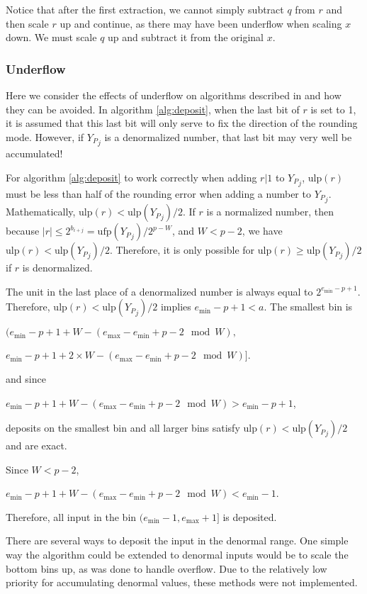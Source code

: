 \documentclass[12pt]{article}
\providecommand{\min}{\ensuremath{\text{min}}}
\providecommand{\max}{\ensuremath{\text{max}}}
\providecommand{\ulp}{\ensuremath{\text{ulp}}}
\providecommand{\ufp}{\ensuremath{\text{ufp}}}
\theoremstyle{plain}
\begin{document}
      Notice that after the first extraction, we cannot simply subtract $q$ from $r$ and then scale $r$ up and continue, as there may have been underflow when scaling $x$ down. We must scale $q$ up and subtract it from the original $x$.

    \subsubsection{Underflow}
      \label{sec:underflow}
      Here we consider the effects of underflow on algorithms described in \cite{repsum} and how they can be avoided. In algorithm \ref{alg:deposit}, when the last bit of $r$ is set to 1, it is assumed that this last bit will only serve to fix the direction of the rounding mode. However, if ${Y_P}_j$ is a denormalized number, that last bit may very well be accumulated!

      For algorithm \ref{alg:deposit} to work correctly when adding $r | 1$ to ${Y_P}_j$, $\ulp(r)$ must be less than half of the rounding error when adding a number to ${Y_P}_j$. Mathematically, $\ulp(r) < \ulp({Y_P}_j)/2$.
      If $r$ is a normalized number, then because $|r| \leq 2^{b_{i + j}} = \ufp({Y_P}_j)/2^{p - W}$, and $W < p - 2$, we have $\ulp(r) < \ulp({Y_P}_j)/2$. Therefore, it is only possible for $\ulp(r) \geq \ulp({Y_P}_j)/2$ if $r$ is denormalized.

      The unit in the last place of a denormalized number is always equal to $2^{e_{\min} - p + 1}$. Therefore, $\ulp(r) < \ulp({Y_P}_j)/2$ implies $e_{\min} - p + 1 < a$. The smallest bin is

      $(e_{\min} - p + 1 + W - (e_{\max} - e_{\min} + p - 2 \mod W),$

      \indent \indent $e_{\min} - p + 1 + 2 \times W - (e_{\max} - e_{\min} + p - 2 \mod W)]$.

      and since

      $e_{\min} - p + 1 + W - (e_{\max} - e_{\min} + p - 2 \mod W) > e_{\min} - p + 1$,

      deposits on the smallest bin and all larger bins satisfy $\ulp(r) < \ulp({Y_P}_j)/2$ and are exact.

      Since $W < p - 2$,

      $e_{\min} - p + 1 + W - (e_{\max} - e_{\min} + p - 2 \mod W) < e_{\min} - 1$.

      Therefore, all input in the bin $(e_{\min} - 1, e_{\max} + 1]$ is deposited.

      There are several ways to deposit the input in the denormal range. One simple way the algorithm could be extended to denormal inputs would be to scale the bottom bins up, as was done to handle overflow. Due to the relatively low priority for accumulating denormal values, these methods were not implemented.
\end{document}
